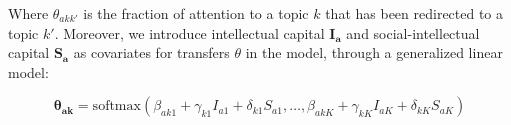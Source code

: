 \documentclass{article}
\begin{document}
Where $\theta_{akk'}$ is the fraction of attention to a topic $k$ that has been redirected to a topic $k'$. %
Moreover, we introduce intellectual capital $\bm{I_a}$ and social-intellectual capital $\bm{S_a}$ as covariates for transfers $\theta$ in the model, through a generalized linear model:

\begin{equation}
    \bm{\theta_{ak}} = \text{softmax}\left(\beta_{ak1} + \gamma_{k1} I_{a1} + \delta_{k1} S_{a1}, \dots,\beta_{akK} + \gamma_{kK} I_{aK} + \delta_{kK} S_{aK}\right)
    \label{eq:glm}
\end{equation}
\end{document}
